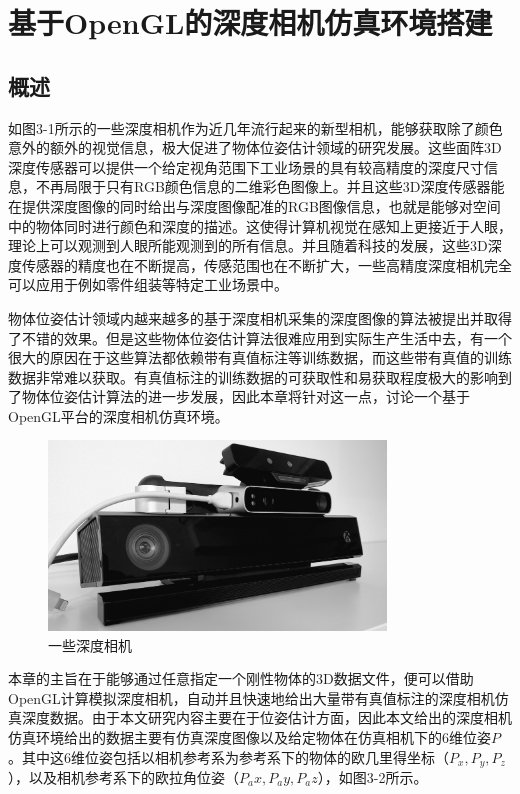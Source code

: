 \chapter{基于OpenGL的深度相机仿真环境搭建}

\section{概述}
如图3-1所示的一些深度相机作为近几年流行起来的新型相机，能够获取除了颜色意外的额外的视觉信息，极大促进了物体位姿估计领域的研究发展。这些面阵3D深度传感器可以提供一个给定视角范围下工业场景的具有较高精度的深度尺寸信息，不再局限于只有RGB颜色信息的二维彩色图像上。并且这些3D深度传感器能在提供深度图像的同时给出与深度图像配准的RGB图像信息，也就是能够对空间中的物体同时进行颜色和深度的描述。这使得计算机视觉在感知上更接近于人眼，理论上可以观测到人眼所能观测到的所有信息。并且随着科技的发展，这些3D深度传感器的精度也在不断提高，传感范围也在不断扩大，一些高精度深度相机完全可以应用于例如零件组装等特定工业场景中。

物体位姿估计领域内越来越多的基于深度相机采集的深度图像的算法被提出并取得了不错的效果。但是这些物体位姿估计算法很难应用到实际生产生活中去，有一个很大的原因在于这些算法都依赖带有真值标注等训练数据，而这些带有真值的训练数据非常难以获取。有真值标注的训练数据的可获取性和易获取程度极大的影响到了物体位姿估计算法的进一步发展，因此本章将针对这一点，讨论一个基于OpenGL平台的深度相机仿真环境。

\begin{figure}[htb]
	\centering 
	\includegraphics[width=0.8\textwidth]{./mypic/一些深度相机.jpg} 
	\caption{一些深度相机} 
\end{figure}


本章的主旨在于能够通过任意指定一个刚性物体的3D数据文件，便可以借助OpenGL计算模拟深度相机，自动并且快速地给出大量带有真值标注的深度相机仿真深度数据。由于本文研究内容主要在于位姿估计方面，因此本文给出的深度相机仿真环境给出的数据主要有仿真深度图像以及给定物体在仿真相机下的6维位姿$P$。其中这6维位姿包括以相机参考系为参考系下的物体的欧几里得坐标（$P_x,P_y,P_z$），以及相机参考系下的欧拉角位姿（$P_ax,P_ay,P_az$），如图3-2所示。

